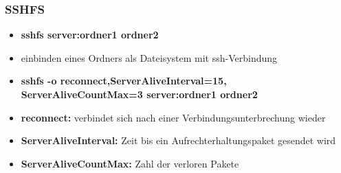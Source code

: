 \begin{frame}
\frametitle{SSHFS}
\begin{itemize}
\item \textbf{sshfs server:ordner1 ordner2}
\pause
\item einbinden eines Ordners als Dateisystem mit ssh-Verbindung
\pause
\item \textbf{sshfs -o reconnect,ServerAliveInterval=15, ServerAliveCountMax=3 server:ordner1 ordner2}
\pause
\item \textbf{reconnect:} verbindet sich nach einer Verbindungsunterbrechung wieder
\pause
\item \textbf{ServerAliveInterval:} Zeit bis ein Aufrechterhaltungspaket gesendet wird
\pause
\item \textbf{ServerAliveCountMax:} Zahl der verloren Pakete
\end{itemize}
\end{frame}